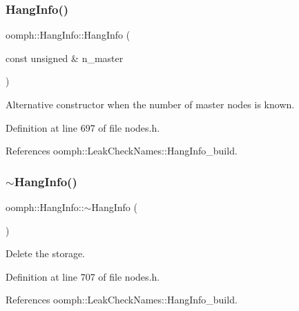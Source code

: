 \subsubsection{\texorpdfstring{Hang\+Info()}{HangInfo()}\hspace{0.1cm}{\footnotesize\ttfamily [2/3]}}
{\footnotesize\ttfamily oomph\+::\+Hang\+Info\+::\+Hang\+Info (\begin{DoxyParamCaption}\item[{const unsigned \&}]{n\+\_\+master }\end{DoxyParamCaption})\hspace{0.3cm}{\ttfamily [inline]}}



Alternative constructor when the number of master nodes is known. 



Definition at line 697 of file nodes.\+h.



References oomph\+::\+Leak\+Check\+Names\+::\+Hang\+Info\+\_\+build.

\mbox{\label{classoomph_1_1HangInfo_a12e76983eb02020a62cd49db543414a2}} 
\subsubsection{\texorpdfstring{$\sim$\+Hang\+Info()}{~HangInfo()}}
{\footnotesize\ttfamily oomph\+::\+Hang\+Info\+::$\sim$\+Hang\+Info (\begin{DoxyParamCaption}{ }\end{DoxyParamCaption})\hspace{0.3cm}{\ttfamily [inline]}}



Delete the storage. 



Definition at line 707 of file nodes.\+h.



References oomph\+::\+Leak\+Check\+Names\+::\+Hang\+Info\+\_\+build.

\mbox{\label{classoomph_1_1HangInfo_a4b5af6e4adb35de2c039be5b9e26d662}} 

